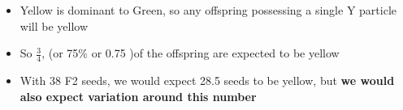 \documentclass{beamer}
\begin{document}
\begin{frame}
\begin{columns}
	\begin{column}{0.7\textwidth}
\begin{itemize}
\item Yellow is dominant to Green, so any offspring possessing a single Y particle will be yellow
\item So $\frac{3}{4}$, (or 75\% or 0.75 )of the offspring are expected to be yellow
\item With 38 F2 seeds, we would expect 28.5 seeds to be yellow, but \textbf{we would also expect variation around this number}

\end{itemize}
	\end{column}
	\end{columns}
	
	
\end{frame}
\end{document}

